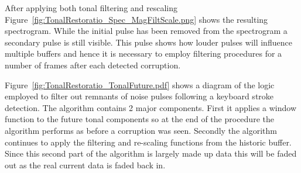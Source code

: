After applying both tonal filtering and rescaling Figure~\ref{fig:TonalRestoratio_Spec_MagFiltScale.png} shows the resulting spectrogram. While the initial pulse has been removed from the spectrogram a secondary pulse is still visible. This pulse shows how louder pulses will influence multiple buffers and hence it is necessary to employ filtering procedures for a number of frames after each detected corruption.

Figure~\ref{fig:TonalRestoratio_TonalFuture.pdf} shows a diagram of the logic employed to filter out remnants of noise pulses following a keyboard stroke detection. The algorithm contains 2 major components. First it applies a window function to the future tonal components so at the end of the procedure the algorithm performs as before a corruption was seen. Secondly the algorithm continues to apply the filtering and re-scaling functions from the historic buffer. Since this second part of the algorithm is largely made up data this will be faded out as the real current data is faded back in.

